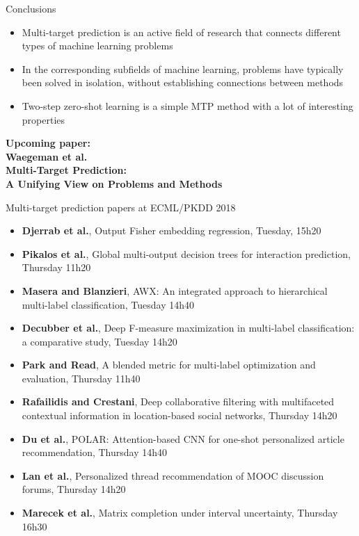 \documentclass[]{beamer}
\renewcommand{\alert}[1]{\textbf{\color{putblue} #1}}
\begin{document}
\begin{frame}{Conclusions}

\begin{itemize}
\item Multi-target prediction is an active field of research that connects different types of machine learning problems
\item In the corresponding subfields of machine learning, problems have typically been solved in isolation, without establishing connections between methods
\item Two-step zero-shot learning is a simple MTP method with a lot of interesting properties
\end{itemize}

\begin{center}
{\bf Upcoming paper: \\
Waegeman et al. \\ Multi-Target Prediction: \\ A Unifying View on Problems and Methods}

\end{center}

\end{frame}

\begin{frame}{Multi-target prediction papers at ECML/PKDD 2018}

\begin{itemize}
\item \alert{Djerrab et al.}, Output Fisher embedding regression, Tuesday, 15h20
\item \alert{Pikalos et al.}, Global multi-output decision trees for interaction prediction, Thursday 11h20
\item \alert{Masera and Blanzieri}, AWX: An integrated approach to hierarchical multi-label classification, Tuesday 14h40
\item \alert{Decubber et al.}, Deep F-measure maximization in multi-label classification: a comparative study, Tuesday 14h20
\item \alert{Park and Read}, A blended metric for multi-label optimization and evaluation, Thursday 11h40
\item \alert{Rafailidis and Crestani}, Deep collaborative filtering with multifaceted contextual information in location-based social networks, Thursday 14h20
\item \alert{Du et al.}, POLAR: Attention-based CNN for one-shot personalized article recommendation, Thursday 14h40
\item \alert{Lan et al.}, Personalized thread recommendation of MOOC discussion forums, Thursday 14h20
\item \alert{Marecek et al.}, Matrix completion under interval uncertainty, Thursday 16h30
\end{itemize}

\end{frame}
\end{document}
